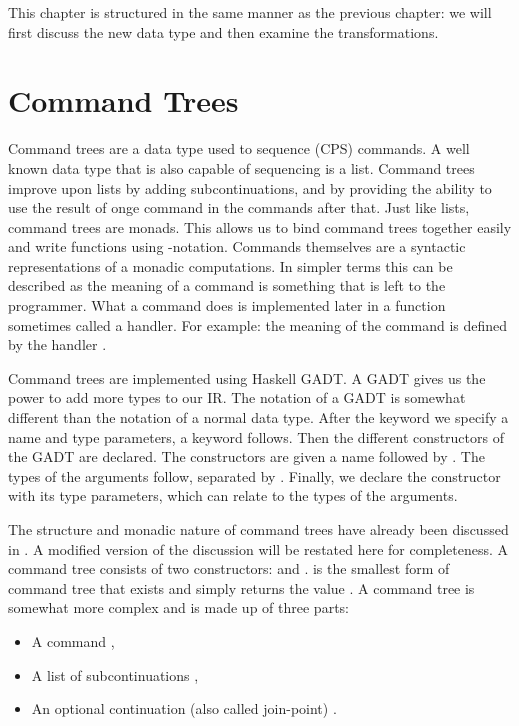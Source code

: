 This chapter is structured in the same manner as the previous chapter: we will first discuss the new  data type and then examine the  transformations.

\section{\label{section:commandtree}Command Trees}
Command trees are a data type used to sequence (CPS) commands. A well known data type that is also capable of sequencing is a list. Command trees improve upon lists by adding subcontinuations, and by providing the ability to use the result of onge command in the commands after that. Just like lists, command trees are monads. This allows us to bind command trees together easily and write functions using -notation. Commands themselves are a syntactic representations of a monadic computations. In simpler terms this can be described as the meaning of a command is something that is left to the programmer. What a command does is implemented later in a function sometimes called a handler. For example: the meaning of the  command is defined by the handler .

Command trees are implemented using Haskell GADT. A GADT gives us the power to add more types to our IR. The notation of a GADT is somewhat different than the notation of a normal data type. After the  keyword we specify a name and type parameters, a  keyword follows. Then the different constructors of the GADT are declared. The constructors are given a name followed by \icode{::}. The types of the arguments follow, separated by \icode{->}. Finally, we declare the constructor with its type parameters, which can relate to the types of the arguments.

The structure and monadic nature of command trees have already been discussed in  \autocite{commandtreespoulsen}. A modified version of the discussion will be restated here for completeness. A command tree consists of two constructors:  and .  is the smallest form of command tree that exists and simply returns the value . A  command tree is somewhat more complex and is made up of three parts:

\begin{itemize}
\item A command ,
\item A list of subcontinuations ,
\item An optional continuation (also called join-point) .
\end{itemize}

